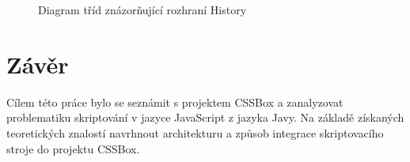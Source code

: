 \begin{figure}[H]
  \begin{center}
    \caption{Diagram tříd znázorňující rozhraní History}
    \label{Figure.History}
  \end{center}
\end{figure}

\chapter{Závěr}
\label{Chapter.Final}

Cílem této práce bylo se seznámit s projektem CSSBox a zanalyzovat problematiku skriptování v jazyce JavaScript z jazyka Javy. Na základě získaných teoretických znalostí navrhnout architekturu a způsob integrace skriptovacího stroje do projektu CSSBox.

